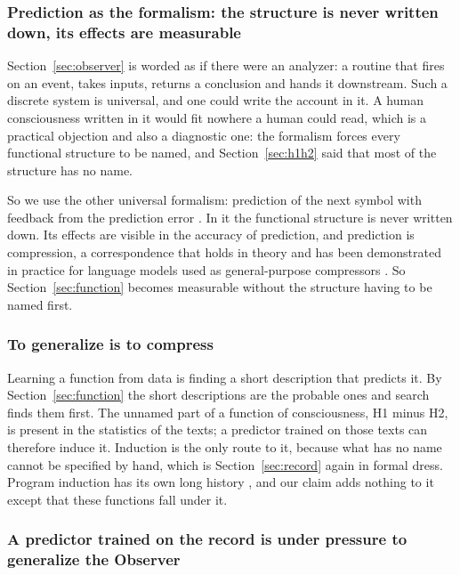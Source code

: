 \subsubsection{Prediction as the formalism: the structure is never written down, its effects are measurable}
\label{sec:formalism}

Section~\ref{sec:observer} is worded as if there were an analyzer: a routine that fires on an event,
takes inputs, returns a conclusion and hands it downstream. Such a discrete system is universal, and one
could write the account in it. A human consciousness written in it would fit nowhere a human could read,
which is a practical objection and also a diagnostic one: the formalism forces every functional
structure to be named, and Section~\ref{sec:h1h2} said that most of the structure has no name.

So we use the other universal formalism: prediction of the next symbol with feedback from the
prediction error \citep{solomonoff1964a}. In it the functional structure is never written down. Its
effects are visible in the accuracy of prediction, and prediction is compression, a correspondence that
holds in theory and has been demonstrated in practice for language models used as general-purpose
compressors \citep{deletang2024}. So Section~\ref{sec:function} becomes measurable without the structure
having to be named first.

\subsubsection{To generalize is to compress}
\label{sec:generalize}

Learning a function from data is finding a short description that predicts it. By
Section~\ref{sec:function} the short descriptions are the probable ones and search finds them first. The
unnamed part of a function of consciousness, H1 minus H2, is present in the statistics of the texts; a
predictor trained on those texts can therefore induce it. Induction is the only route to it, because
what has no name cannot be specified by hand, which is Section~\ref{sec:record} again in formal dress. Program induction has
its own long history \citep{solomonoff1964a,muggleton1994}, and our claim adds nothing to it except that
these functions fall under it.

\subsubsection{A predictor trained on the record is under pressure to generalize the Observer}

